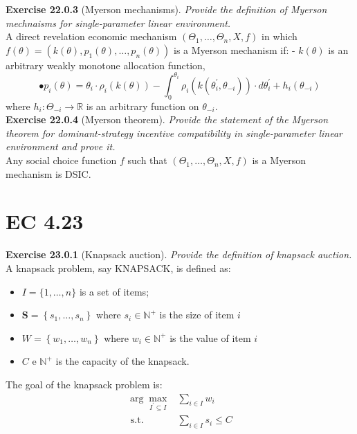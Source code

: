 \textbf{Exercise 22.0.3} (Myerson mechanisms). \textit{Provide the definition of Myerson mechnaisms for single-parameter linear environment.}\\

A direct revelation economic mechanism $\left(\Theta_{1}, \ldots, \Theta_{n}, X, f\right)$ in which $f(\theta)=\left(k(\theta), p_{1}(\theta), \ldots, p_{n}(\theta)\right)$ is a Myerson mechanism if:
- $k(\theta)$ is an arbitrary weakly monotone allocation function,
$$
\bullet p_{i}(\theta)=\theta_{i} \cdot \rho_{i}(k(\theta))-\int_{0}^{\theta_{i}} \rho_{i}\left(k\left(\theta_{i}^{\prime}, \theta_{-i}\right)\right) \cdot d \theta_{i}^{\prime}+h_{i}\left(\theta_{-i}\right)
$$
where $h_{i}: \Theta_{-i} \rightarrow \mathbb{R}$ is an arbitrary function on $\theta_{-i}$.\\

\textbf{Exercise 22.0.4} (Myerson theorem). \textit{Provide the statement of the Myerson theorem for dominant-strategy incentive compatibility in single-parameter linear environment and prove it.}\\

Any social choice function $f$ such that $\left(\Theta_{1}, \ldots, \Theta_{n}, X, f\right)$ is a Myerson mechanism is DSIC.

\section{EC 4.23}

\textbf{Exercise 23.0.1} (Knapsack auction). \textit{Provide the definition of knapsack auction.}\\

A knapsack problem, say KNAPSACK, is defined as:
\begin{itemize}
\item $I=\{1, \ldots, n\}$ is a set of items;
\item $\boldsymbol{S}=\left\{s_{1}, \ldots, s_{n}\right\}$ where $s_{i} \in \mathbb{N}^{+}$ is the size of item $i$
\item $W=\left\{w_{1}, \ldots, w_{n}\right\}$ where $w_{i} \in \mathbb{N}^{+}$ is the value of item $i$
\item $C$ e $\mathbb{N}^{+}$ is the capacity of the knapsack. 
\end{itemize}
The goal of the knapsack problem is:
$$
\begin{aligned}
\arg \max _{I^{\prime} \subseteq I} & \sum_{i \in I} w_{i} \\
\text { s.t. } & \sum_{i \in I} s_{i} \leqslant C
\end{aligned}
$$

